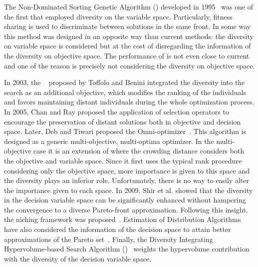 The Non-Dominated Sorting Genetic Algorithm (\NSGA{}) developed in 1995~\cite{srinivas1994muiltiobjective} 
was one of the first \MOEAS{} that employed diversity on the variable space.
%
Particularly, fitness sharing is used to discriminate between solutions in the same front.
%
%
In some way this method was designed in an opposite way than current methods: the diversity
on variable space is considered but at the cost of disregarding the information of the diversity
on objective space.
%
The performance of \NSGA{} is not even close to current \MOEAS{} and one 
of the reason is precisely not considering the diversity on objective space.

In 2003, the \GDEA{}~\cite{toffolo2003genetic} proposed by Toffolo and Benini integrated the diversity into the search 
as an additional objective, which modifies the ranking of the individuals and favors maintaining distant individuals
during the whole optimization process.
%
In 2005, Chan and Ray \cite{chan2005evolutionary} proposed the application of selection operators to
encourage the preservation of distant solutions both in objective and decision space.
%
%
Later, Deb and Tiwari proposed the Omni-optimizer~\cite{deb2008omni}.
%
This algorithm is designed as a generic multi-objective, multi-optima optimizer. %
%
In the multi-objective case it is an extension of \NSGAII{} where the crowding distance considers both the objective and variable space.
%
Since it first uses the typical rank procedure considering only the objective space, more importance is given to this space 
and the diversity plays an inferior role.
%
Unfortunately, there is no way to easily alter the importance given to each space.
%
In 2009, Shir et al. showed that the diversity in the decision variable space can be significantly enhanced without hampering 
the convergence to a diverse Pareto-front approximation.
%
Following this insight, the \CMAES{} niching framework was proposed~\cite{shir2009enhancing}.
%
Estimation of Distribution Algorithms have also considered the information of the decision space
to attain better approximations of the Pareto set~\cite{zhou2009approximating}.
%
Finally, the Diversity Integrating Hypervolume-based Search Algorithm (\DIVA{})~\cite{ulrich2010integrating}
weights the hypervolume contribution with the diversity of the decision variable space.

